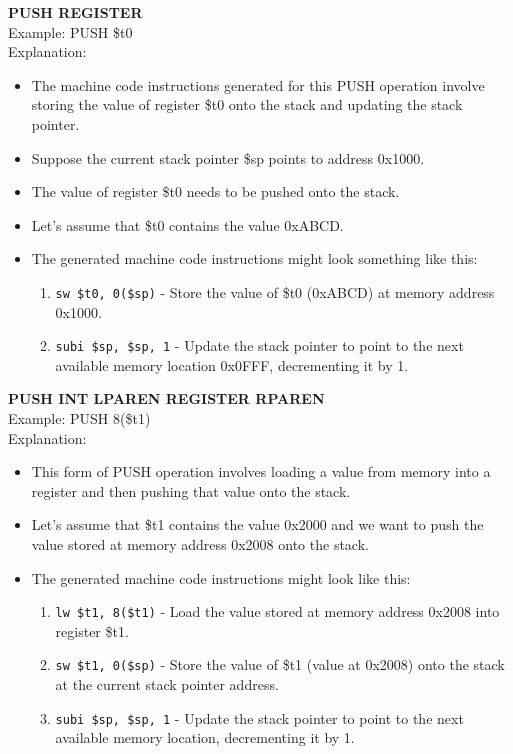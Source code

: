 \documentclass[a4paper]{article}
\begin{document}
\textbf{PUSH REGISTER}\\
Example: PUSH \$t0\\
Explanation:
\begin{itemize}
    \item The machine code instructions generated for this PUSH operation involve storing the value of register \$t0 onto the stack and updating the stack pointer.
    \item Suppose the current stack pointer \$sp points to address 0x1000.
    \item The value of register \$t0 needs to be pushed onto the stack.
    \item Let's assume that \$t0 contains the value 0xABCD.
    \item The generated machine code instructions might look something like this:
    \begin{enumerate}
        \item \texttt{sw \$t0, 0(\$sp)} - Store the value of \$t0 (0xABCD) at memory address 0x1000.
        \item \texttt{subi \$sp, \$sp, 1} - Update the stack pointer to point to the next available memory location 0x0FFF, decrementing it by 1.
          \end{enumerate}
\end{itemize}
\vspace{0.35cm}
\textbf{PUSH INT LPAREN REGISTER RPAREN}\\
Example: PUSH 8(\$t1)\\
Explanation:
\begin{itemize}
    \item This form of PUSH operation involves loading a value from memory into a register and then pushing that value onto the stack.
    \item Let's assume that \$t1 contains the value 0x2000 and we want to push the value stored at memory address 0x2008 onto the stack.
    \item The generated machine code instructions might look like this:
    \begin{enumerate}
        \item \texttt{lw \$t1, 8(\$t1)} - Load the value stored at memory address 0x2008 into register \$t1.
      \item \texttt{sw \$t1, 0(\$sp)} - Store the value of \$t1 (value at 0x2008) onto the stack at the current stack pointer address.
      \item \texttt{subi \$sp, \$sp, 1} - Update the stack pointer to point to the next available memory location, decrementing it by 1.
      \end{enumerate}
      \end{itemize}
\end{document}
